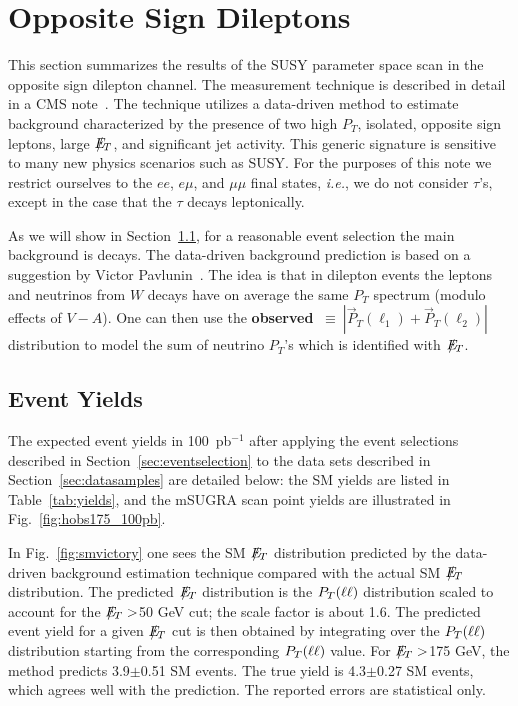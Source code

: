 \section{Opposite Sign Dileptons}
\label{sec:osstudies}

This section summarizes the results of the SUSY parameter space scan
in the opposite sign dilepton channel. The measurement technique is
described in detail in a CMS note~\cite{osnote}. The technique
utilizes a data-driven method to estimate background characterized
by the presence of two high $P_T$, isolated, opposite sign leptons,
large $E\!\!\!\!/_T$, and significant jet activity. This generic signature is
sensitive to many new physics scenarios such as SUSY.  For the purposes
of this note we restrict ourselves to the $ee$, $e\mu$, and $\mu\mu$
final states, {\em i.e.}, we do not consider $\tau$'s, except in the
case that the $\tau$ decays leptonically. 

As we will show in Section~\ref{sec:yields}, for a reasonable event
selection the main background is \ttbar decays. The data-driven
background prediction is based on a suggestion by Victor
Pavlunin~\cite{victor}. The idea is that in dilepton \ttbar events
the leptons and neutrinos from $W$ decays have on average the same
$P_T$ spectrum (modulo effects of $V-A$). One can then use the {\bf
observed} \ptll $~\equiv~|\vec{P}_T(\ell_1) + \vec{P}_T(\ell_2)|$
distribution to model the sum of neutrino $P_T$'s which is identified
with $E\!\!\!\!/_T$. 

\subsection{Event Yields}
\label{sec:yields}

The expected event yields in 100~pb$^{-1}$ after applying the event selections
described in Section~\ref{sec:eventselection} to the data sets described in
Section~\ref{sec:datasamples} are detailed below: the SM yields are listed in
Table~\ref{tab:yields}, and the mSUGRA scan point yields are illustrated in
Fig.~\ref{fig:hobs175_100pb}.

In Fig.~\ref{fig:smvictory} one sees the SM $E\!\!\!\!/_T$ distribution predicted
by the data-driven background estimation technique compared with the actual 
SM $E\!\!\!\!/_T$ distribution. The predicted $E\!\!\!\!/_T$ distribution
is the $P_T(\ell\ell)$ distribution scaled to account for the $E\!\!\!\!/_T>$50 GeV cut; the scale
factor is about 1.6. The predicted event yield for a given $E\!\!\!\!/_T$ cut is then obtained by integrating
over the $P_T(\ell\ell)$ distribution starting from the corresponding $P_T(\ell\ell)$ value. 
For $E\!\!\!\!/_T>$175 GeV, the method predicts
3.9$\pm$0.51 SM events. The true yield is 4.3$\pm$0.27 SM events, which agrees
well with the prediction. The reported errors are statistical only.


